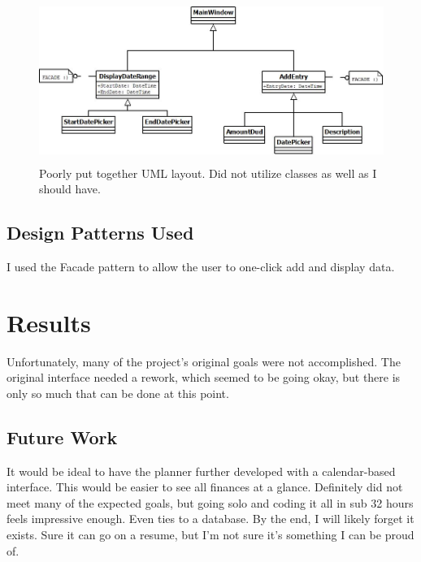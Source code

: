 \documentclass[10pt,conference,onecolumn,compsoc]{IEEEtran}
\begin{document}
\begin{figure}[ht!]
\includegraphics[height=200px, width=500px]{FinancialDMDiagram.jpg}
\caption{Poorly put together UML layout. Did not utilize classes as well as I should have.}
\label{UML}
\end{figure}


\subsection{Design Patterns Used}
I used the Facade pattern to allow the user to one-click add and display data.

\section{Results}
Unfortunately, many of the project's original goals were not accomplished. The original interface needed a rework, which seemed to be going okay, but there is only so much that can be done at this point.

\subsection{Future Work}
It would be ideal to have the planner further developed with a calendar-based interface. This would be easier to see all finances at a glance.
Definitely did not meet many of the expected goals, but going solo and coding it all in sub 32 hours feels impressive enough. Even ties to a database.
By the end, I will likely forget it exists. Sure it can go on a resume, but I'm not sure it's something I can be proud of.


\end{document}
